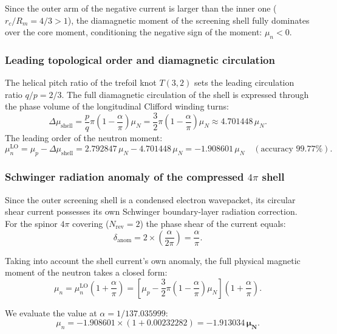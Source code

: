\documentclass[11pt,a4paper]{article}
\theoremstyle{definition}
\theoremstyle{remark}
\begin{document}
Since the outer arm of the negative current is larger than the inner one ($r_c / R_m = 4/3 > 1$), the diamagnetic moment of the screening shell fully dominates over the core moment, conditioning the negative sign of the moment: $\mu_n < 0$.

\subsubsection{Leading topological order and diamagnetic circulation}

The helical pitch ratio of the trefoil knot $T(3,2)$ sets the leading circulation ratio $q/p = 2/3$. The full diamagnetic circulation of the shell is expressed through the phase volume of the longitudinal Clifford winding turns:
\begin{equation}
\Delta \mu_{\mathrm{shell}} = \frac{p}{q} \pi \left(1 - \frac{\alpha}{\pi}\right) \mu_N = \frac{3}{2}\pi \left(1 - \frac{\alpha}{\pi}\right) \mu_N \approx 4.701448\,\mu_N.
\end{equation}
The leading order of the neutron moment:
\begin{equation}
\mu_n^{\mathrm{LO}} = \mu_p - \Delta \mu_{\mathrm{shell}} = 2.792847\,\mu_N - 4.701448\,\mu_N = -1.908601\,\mu_N \quad (\text{accuracy } 99.77\%).
\end{equation}
\subsubsection{Schwinger radiation anomaly of the compressed $4\pi$ shell}

Since the outer screening shell is a condensed electron wavepacket, its circular shear current possesses its own Schwinger boundary-layer radiation correction. For the spinor $4\pi$ covering ($N_{\mathrm{rev}} = 2$) the phase shear of the current equals:
\begin{equation}
\delta_{\mathrm{anom}} = 2 \times \left(\frac{\alpha}{2\pi}\right) = \frac{\alpha}{\pi}.
\end{equation}

Taking into account the shell current's own anomaly, the full physical magnetic moment of the neutron takes a closed form:
\begin{equation}
\mu_n = \mu_n^{\mathrm{LO}} \left(1 + \frac{\alpha}{\pi}\right) = \left[ \mu_p - \frac{3}{2}\pi\left(1 - \frac{\alpha}{\pi}\right)\mu_N \right] \left(1 + \frac{\alpha}{\pi}\right).
\end{equation}

We evaluate the value at $\alpha = 1/137.035999$:
\begin{equation}
\mu_n = -1.908601 \times \left(1 + 0.00232282\right) = \mathbf{-1.913034\,\mu_N}.
\end{equation}
\end{document}
